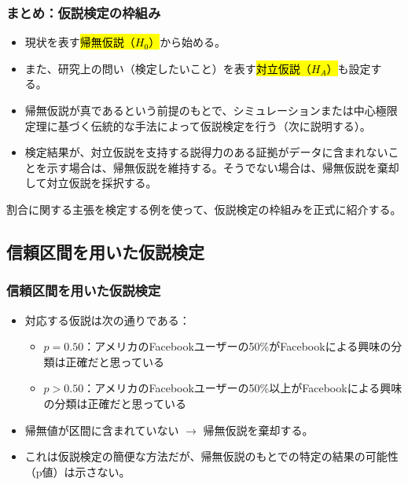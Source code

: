 
\begin{frame}
\frametitle{まとめ：仮説検定の枠組み}

\begin{itemize}
\item 現状を表す\hl{帰無仮説（$H_0$）}から始める。
\item また、研究上の問い（検定したいこと）を表す\hl{対立仮説（$H_A$）}も設定する。
\item 帰無仮説が真であるという前提のもとで、シミュレーションまたは中心極限定理に基づく伝統的な手法によって仮説検定を行う（次に説明する）。
\item 検定結果が、対立仮説を支持する説得力のある証拠がデータに含まれないことを示す場合は、帰無仮説を維持する。そうでない場合は、帰無仮説を棄却して対立仮説を採択する。
\end{itemize}
割合に関する主張を検定する例を使って、仮説検定の枠組みを正式に紹介する。

\end{frame}


\subsection{信頼区間を用いた仮説検定}


\begin{frame}
\frametitle{信頼区間を用いた仮説検定}

{\small {}}

\begin{itemize}

\item 対応する仮説は次の通りである：
\begin{itemize}
\item[$H_0$:] $p = 0.50$：アメリカのFacebookユーザーの50\%がFacebookによる興味の分類は正確だと思っている
\item[$H_A$:] $p > 0.50$：アメリカのFacebookユーザーの50\%以上がFacebookによる興味の分類は正確だと思っている
\end{itemize}

\item 帰無値が区間に含まれていない $\rightarrow$ 帰無仮説を棄却する。

\item これは仮説検定の簡便な方法だが、帰無仮説のもとでの特定の結果の可能性（p値）は示さない。

\end{itemize}

\end{frame}


